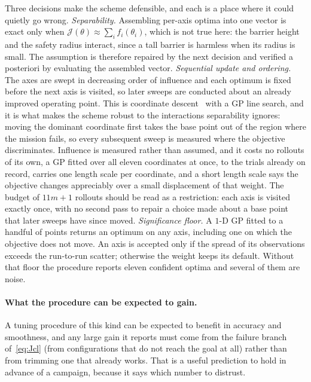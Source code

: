 \documentclass[11pt,a4paper]{article}
\begin{document}
Three decisions make the scheme defensible, and each is a place where it could quietly go wrong.
\emph{Separability.} Assembling per-axis optima into one vector is exact only when
$\mathcal{J}(\theta)\approx\sum_i f_i(\theta_i)$, which is not true here: the barrier height and the safety
radius interact, since a tall barrier is harmless when its radius is small. The assumption is therefore
repaired by the next decision and verified a posteriori by evaluating the assembled vector.
\emph{Sequential update and ordering.} The axes are swept in decreasing order of influence and each optimum
is fixed before the next axis is visited, so later sweeps are conducted about an already improved operating
point. This is coordinate descent~\cite{wright2015coordinate} with a GP line search, and it is what makes the scheme robust to the
interactions separability ignores: moving the dominant coordinate first takes the base point out of the
region where the mission fails, so every subsequent sweep is measured where the objective discriminates.
Influence is measured rather than assumed, and it costs no rollouts of its own, a GP fitted over all
eleven coordinates at once, to the trials already on record, carries one length scale per coordinate, and a
short length scale says the objective changes appreciably over a small displacement of that weight. The
budget of $11m+1$ rollouts should be read as a restriction: each axis is visited exactly once, with no
second pass to repair a choice made about a base point that later sweeps have since moved.
\emph{Significance floor.} A $1$-D GP fitted to a handful of points returns an optimum on any axis, including
one on which the objective does not move. An axis is accepted only if the spread of its observations exceeds
the run-to-run scatter; otherwise the weight keeps its default. Without that floor the procedure reports
eleven confident optima and several of them are noise.

\paragraph{What the procedure can be expected to gain.} A tuning procedure of this kind can be expected to benefit in accuracy
and smoothness, and any large gain it reports must come from the failure branch of~\eqref{eq:Jcl} (from
configurations that do not reach the goal at all) rather than from trimming one that already works. That
is a useful prediction to hold in advance of a campaign, because it says which number to distrust.
\end{document}
